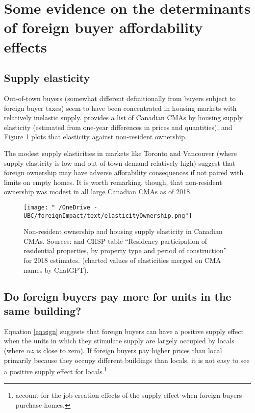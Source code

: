 \documentclass[12pt]{article}
\begin{document}
\section{Some evidence on the determinants of foreign buyer affordability effects}

\subsection{Supply elasticity}

Out-of-town buyers (somewhat different definitionally from buyers subject to foreign buyer taxes) seem to have been concentrated in housing markets with relatively inelastic supply. \textcite{paixao2021housing} provides a list of Canadian CMAs by housing supply elasticity (estimated from one-year differences in prices and quantities), and Figure \ref{fig:elasticityNonResident} plots that elasticity against non-resident ownership. 

The modest supply elasticities in markets like Toronto and Vancouver (where supply elasticity is low and out-of-town demand relatively high) suggest that foreign ownership may have adverse afforability consequences if not paired with limits on empty homes. It is worth remarking, though, that non-resident ownership was modest in all large Canadian CMAs as of 2018.

\begin{figure}
	\centering
	\texttt{[image: "~/OneDrive - UBC/foreignImpact/text/elasticityOwnership.png"]}
\caption{\label{fig:elasticityNonResident} Non-resident ownership and housing supply elasticity in Canadian CMAs. Sources: \textcite{paixao2021housing} and CHSP table ``Residency participation of residential properties, by property type and period of construction'' for 2018 estimates. (charted values of elasticities merged on CMA names by ChatGPT).}
\end{figure}

\subsection{Do foreign buyers pay more for units in the same building?}

Equation \eqref{eq:sign} suggests that foreign buyers can have a positive supply effect when the units in which they stimulate supply are largely occupied by locals (where $\alpha z$ is close to zero). If foreign buyers pay higher prices than local primarily because they occupy different buildings than locals, it is not easy to see a positive supply effect for locals.\footnote{\textcite{FavilukisVanNieuwerburgh} account for the job creation effects of the supply effect when foreign buyers purchase homes.}
\end{document}
